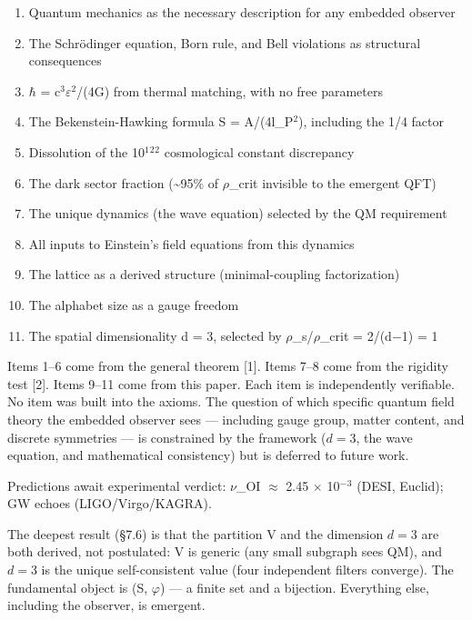 \documentclass[
  11pt,
]{article}
\providecommand{\tightlist}{%
  \setlength{\itemsep}{0pt}\setlength{\parskip}{0pt}}
\begin{document}
\begin{enumerate}
\def\labelenumi{\arabic{enumi}.}
\tightlist
\item
  Quantum mechanics as the necessary description for any embedded
  observer
\item
  The Schrödinger equation, Born rule, and Bell violations as structural
  consequences
\item
  \ensuremath{\hbar} = c\ensuremath{^3}\ensuremath{\varepsilon}\ensuremath{^2}/(4G) from thermal matching, with no free parameters
\item
  The Bekenstein-Hawking formula S = A/(4l\_P\ensuremath{^2}), including the 1/4
  factor
\item
  Dissolution of the 10\ensuremath{^1}\ensuremath{^2}\ensuremath{^2} cosmological constant discrepancy
\item
  The dark sector fraction (\textasciitilde95\% of \ensuremath{\rho}\_crit invisible to
  the emergent QFT)
\item
  The unique dynamics (the wave equation) selected by the QM requirement
\item
  All inputs to Einstein's field equations from this dynamics
\item
  The lattice as a derived structure (minimal-coupling factorization)
\item
  The alphabet size as a gauge freedom
\item
  The spatial dimensionality d = 3, selected by \ensuremath{\rho}\_s/\ensuremath{\rho}\_crit = 2/(d\ensuremath{-}1) =
  1
\end{enumerate}

Items 1--6 come from the general theorem {[}1{]}. Items 7--8 come from
the rigidity test {[}2{]}. Items 9--11 come from this paper. Each item
is independently verifiable. No item was built into the axioms. The
question of which specific quantum field theory the embedded observer
sees --- including gauge group, matter content, and discrete symmetries
--- is constrained by the framework (\(d = 3\), the wave equation, and
mathematical consistency) but is deferred to future work.

Predictions await experimental verdict: \ensuremath{\nu}\_OI \ensuremath{\approx} 2.45 \ensuremath{\times} 10\ensuremath{^{-}}\ensuremath{^3} (DESI,
Euclid); GW echoes (LIGO/Virgo/KAGRA).

The deepest result (§7.6) is that the partition V and the dimension
\(d = 3\) are both derived, not postulated: V is generic (any small
subgraph sees QM), and \(d = 3\) is the unique self-consistent value
(four independent filters converge). The fundamental object is (S,
\(\varphi\)) --- a finite set and a bijection. Everything else,
including the observer, is emergent.
\end{document}
